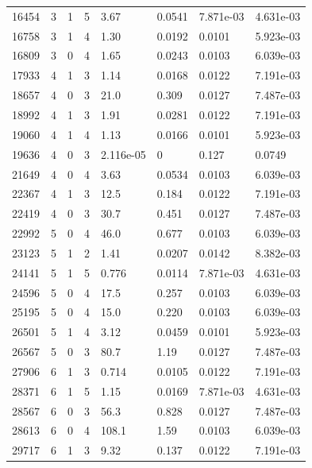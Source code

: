 \documentclass[preview]{standalone}
\begin{document}
{{{\begin{tabular}{L{1.2cm}C{1.2cm} C{0.3cm}C{0.5cm} C{1.4cm}C{1.4cm} C{1.4cm}C{1.4cm}}
  16454  &     3  & 1     &  5 &  3.67  & 0.0541  & 7.871e-03 &  4.631e-03   \\ 
  16758  &     3  & 1     &  4 &  1.30  & 0.0192  & 0.0101 &  5.923e-03   \\ 
  16809  &     3  & 0     &  4 &  1.65  & 0.0243  & 0.0103 &  6.039e-03   \\ 
  17933  &     4  & 1     &  3 &  1.14  & 0.0168  & 0.0122 &  7.191e-03   \\ 
  18657  &     4  & 0     &  3 &  21.0  & 0.309  & 0.0127 &  7.487e-03   \\ 
  18992  &     4  & 1     &  3 &  1.91  & 0.0281  & 0.0122 &  7.191e-03   \\ 
  19060  &     4  & 1     &  4 &  1.13  & 0.0166  & 0.0101 &  5.923e-03   \\ 
  19636  &     4  & 0     &  3 &  2.116e-05  & 0  & 0.127 &  0.0749   \\ 
  21649  &     4  & 0     &  4 &  3.63  & 0.0534  & 0.0103 &  6.039e-03   \\ 
  22367  &     4  & 1     &  3 &  12.5  & 0.184  & 0.0122 &  7.191e-03   \\ 
  22419  &     4  & 0     &  3 &  30.7  & 0.451  & 0.0127 &  7.487e-03   \\ 
  22992  &     5  & 0     &  4 &  46.0  & 0.677  & 0.0103 &  6.039e-03   \\ 
  23123  &     5  & 1     &  2 &  1.41  & 0.0207  & 0.0142 &  8.382e-03   \\ 
  24141  &     5  & 1     &  5 &  0.776  & 0.0114  & 7.871e-03 &  4.631e-03   \\ 
  24596  &     5  & 0     &  4 &  17.5  & 0.257  & 0.0103 &  6.039e-03   \\ 
  25195  &     5  & 0     &  4 &  15.0  & 0.220  & 0.0103 &  6.039e-03   \\ 
  26501  &     5  & 1     &  4 &  3.12  & 0.0459  & 0.0101 &  5.923e-03   \\ 
  26567  &     5  & 0     &  3 &  80.7  & 1.19  & 0.0127 &  7.487e-03   \\ 
  27906  &     6  & 1     &  3 &  0.714  & 0.0105  & 0.0122 &  7.191e-03   \\ 
  28371  &     6  & 1     &  5 &  1.15  & 0.0169  & 7.871e-03 &  4.631e-03   \\ 
  28567  &     6  & 0     &  3 &  56.3  & 0.828  & 0.0127 &  7.487e-03   \\ 
  28613  &     6  & 0     &  4 &  108.1  & 1.59  & 0.0103 &  6.039e-03   \\ 
  29717  &     6  & 1     &  3 &  9.32  & 0.137  & 0.0122 &  7.191e-03   \\ 

\end{tabular}}}}
\end{document}

